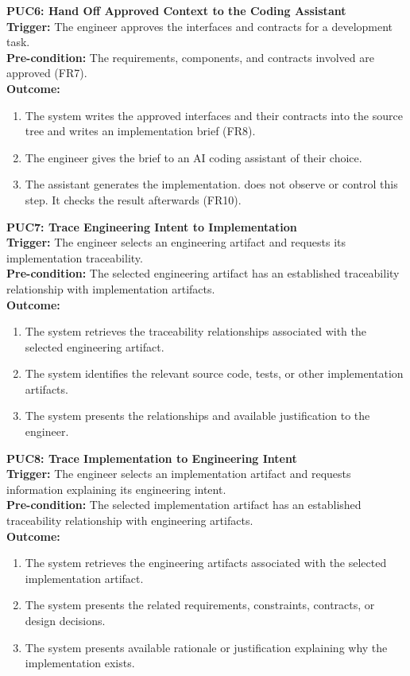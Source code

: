 \documentclass[12pt]{article}
\begin{document}
\noindent\textbf{PUC6: Hand Off Approved Context to the Coding Assistant}\\
\textbf{Trigger:} The engineer approves the interfaces and contracts for a development task.\\
\textbf{Pre-condition:} The requirements, components, and contracts involved are approved (FR7).\\
\textbf{Outcome:}
\begin{enumerate}
    \item The system writes the approved interfaces and their contracts into the source tree and writes an implementation brief (FR8).
    \item The engineer gives the brief to an AI coding assistant of their choice.
    \item The assistant generates the implementation. \progname{} does not observe or control this step. It checks the result afterwards (FR10).
\end{enumerate}

\noindent\textbf{PUC7: Trace Engineering Intent to Implementation}\\
\textbf{Trigger:} The engineer selects an engineering artifact and requests its implementation traceability.\\
\textbf{Pre-condition:} The selected engineering artifact has an established traceability relationship with implementation artifacts.\\
\textbf{Outcome:}
\begin{enumerate}
    \item The system retrieves the traceability relationships associated with the selected engineering artifact.
    \item The system identifies the relevant source code, tests, or other implementation artifacts.
    \item The system presents the relationships and available justification to the engineer.
\end{enumerate}

\noindent\textbf{PUC8: Trace Implementation to Engineering Intent}\\
\textbf{Trigger:} The engineer selects an implementation artifact and requests information explaining its engineering intent.\\
\textbf{Pre-condition:} The selected implementation artifact has an established traceability relationship with engineering artifacts.\\
\textbf{Outcome:}
\begin{enumerate}
    \item The system retrieves the engineering artifacts associated with the selected implementation artifact.
    \item The system presents the related requirements, constraints, contracts, or design decisions.
    \item The system presents available rationale or justification explaining why the implementation exists.
\end{enumerate}
\end{document}
